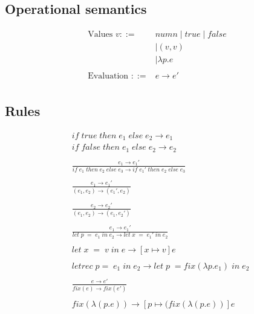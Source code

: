 \documentclass[10pt,a4paper,draft]{article}
\begin{document}
\begin{flushleft}
\section{Operational semantics}
\begin{align*}
\text{Values }v ::=\;&num n \; | \; true \; | \; false \\
&| (v,v) \\
&| \lambda p.e\\
\\
\text{Evaluation } ::= &e \rightarrow e' \\
\end{align*}
\subsection{Rules}
\begin{align*}
\tag{E-IfTrue}
&if \; true  \; then \; e_{1} \; else \; e_{2} \rightarrow e_{1}\\
\tag{E-IfFalse}
&if \; false \; then \; e_{1} \; else \; e_{2} \rightarrow e_{2}\\ \\
\tag{E-IfThenElse}
&\frac{e_{1} \rightarrow e_{1}'}
{if \; e_{1} \; then \; e_{2} \; else \; e_{3} \rightarrow if \; e_{1}' \; then \; e_{2} \; else \; e_{3}}\\ \\
\tag{E-PairLeft}
&\frac{e_{1} \rightarrow e_{1}'}
{(e_{1},e_{2}) \rightarrow (e_{1}',e_{2})} \\ \\
\tag{E-PairRight}
&\frac{e_{2} \rightarrow e_{2}'}
{(e_{1},e_{2}) \rightarrow (e_{1},e_{2}')} \\ \\
\tag{E-Let}
&\frac{e_{1}\rightarrow e_{1}'}
{let \; p \; = \; e_{1} \; in \; e_{2} \rightarrow let \; x \; = \; e_{1}' \; in \; e_{2}}
\\ \\
\tag{E-LetV}
&let \; x \; = \; v \; in \; e \rightarrow [x \mapsto v]e \\ \\
\tag{E-LetRec}
&letrec\;p=\;e_{1} \; in \; e_{2} \rightarrow let \; p \; = fix(\lambda p.e_{1}) \; in \; e_{2} \\ \\ 
\tag{E-Fix}
&\frac{e\rightarrow e'}
{fix(e) \rightarrow fix(e')}\\ \\
\tag{E-FixRec}
&fix(\lambda(p.e)) \rightarrow [p \mapsto (fix (\lambda(p.e))]e \\ \\

\end{align*}
\end{flushleft}
\end{document}
